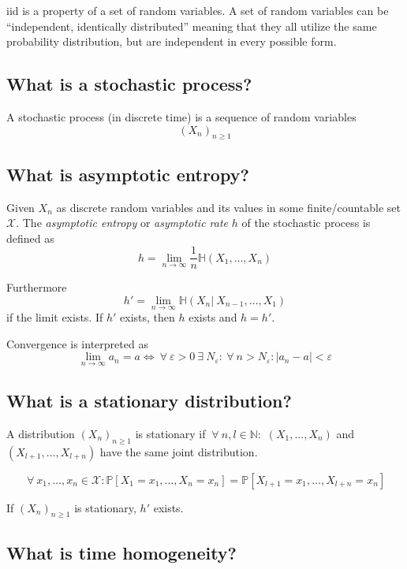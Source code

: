 \documentclass[a4paper]{article}
\newcommand\op[2][P]{\mathbb{#1}\left(#2\right)}
\newcommand\os[2][P]{\mathbb{#1}\left[#2\right]}
\newcommand\cond[3][P]{\mathbb{#1}\left(#2 \left|\:#3\right)\right.}
\newcommand\fall{\:\forall\:}
\newcommand\ex{\:\exists\:}
\newcommand\key[1]{\textit{#1}}
\newcommand\card[1]{\left|#1\right|}
\theoremstyle{definition}
\begin{document}
iid is a property of a set of random variables. A set of random variables can be \enquote{independent, identically distributed} meaning that they all utilize the same probability distribution, but are independent in every possible form.

\subsection{What is a stochastic process?}

A stochastic process (in discrete time) is a sequence of random variables
\[  \left(X_n\right)_{n\geq1} \]

\subsection{What is asymptotic entropy?}

Given $X_n$ as discrete random variables and its values in some finite/countable set $\mathcal{X}$.
The \key{asymptotic entropy} or \key{asymptotic rate} $h$ of the stochastic process is defined as
\[ h = \lim_{n \rightarrow \infty} \frac1n \op[H]{X_1,\dotsc,X_n} \]

Furthermore
\[ h' = \lim_{n \rightarrow \infty} \cond[H]{X_n}{X_{n-1},\dotsc,X_1} \]
if the limit exists. If $h'$ exists, then $h$ exists and $h = h'$.

Convergence is interpreted as
\[
  \lim_{n\rightarrow\infty} a_n = a
    \Leftrightarrow
      \fall \varepsilon > 0
      \ex N_\varepsilon:
      \fall n > N_\varepsilon:
      \card{a_n - a} < \varepsilon
\]

\subsection{What is a stationary distribution?}

A distribution $\left(X_n\right)_{n\geq1}$ is stationary if $\fall n, l \in \mathbb{N}:$ $(X_1,\dotsc,X_n)$ and $(X_{l+1},\dotsc,X_{l+n})$ have the same joint distribution.

\[ \fall x_1, \dotsc, x_n \in \mathcal{X}: \os{X_1=x_1,\dotsc,X_n=x_n} = \os{X_{l+1}=x_1,\dotsc,X_{l+n}=x_n} \]

If $\left(X_n\right)_{n\geq1}$ is stationary, $h'$ exists.

\subsection{What is time homogeneity?}
\end{document}
